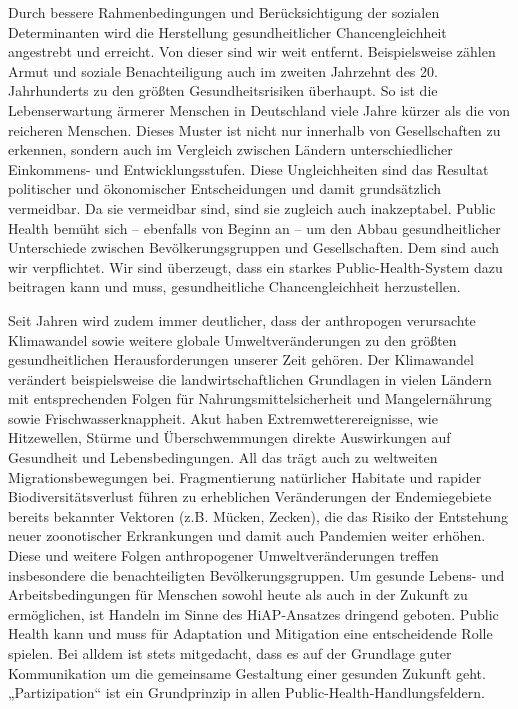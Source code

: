 \documentclass{article}
\begin{document}
Durch bessere Rahmenbedingungen und Berücksichtigung der sozialen Determinanten wird die Herstellung gesundheitlicher Chancengleichheit angestrebt und erreicht. Von dieser sind wir weit entfernt. Beispielsweise zählen Armut und soziale Benachteiligung auch im zweiten Jahrzehnt des 20. Jahrhunderts zu den größten Gesundheitsrisiken überhaupt. So ist die Lebenserwartung ärmerer Menschen in Deutschland viele Jahre kürzer als die von reicheren Menschen. Dieses Muster ist nicht nur innerhalb von Gesellschaften zu erkennen, sondern auch im Vergleich zwischen Ländern unterschiedlicher Einkommens- und Entwicklungsstufen. Diese Ungleichheiten sind das Resultat politischer und ökonomischer Entscheidungen und damit grundsätzlich vermeidbar. Da sie vermeidbar sind, sind sie zugleich auch inakzeptabel. Public Health bemüht sich – ebenfalls von Beginn an – um den Abbau gesundheitlicher Unterschiede zwischen Bevölkerungsgruppen und Gesellschaften. Dem sind auch wir verpflichtet. Wir sind überzeugt, dass ein starkes Public-Health-System dazu beitragen kann und muss, gesundheitliche Chancengleichheit herzustellen.


Seit Jahren wird zudem immer deutlicher, dass der anthropogen verursachte Klimawandel sowie weitere globale Umweltveränderungen zu den größten gesundheitlichen Herausforderungen unserer Zeit gehören. Der Klimawandel verändert beispielsweise die landwirtschaftlichen Grundlagen in vielen Ländern mit entsprechenden Folgen für Nahrungsmittelsicherheit und Mangelernährung sowie Frischwasserknappheit. Akut haben Extremwetterereignisse, wie Hitzewellen, Stürme und Überschwemmungen direkte Auswirkungen auf Gesundheit und Lebensbedingungen. All das trägt auch zu weltweiten Migrationsbewegungen bei. Fragmentierung natürlicher Habitate und rapider Biodiversitätsverlust führen zu erheblichen Veränderungen der Endemiegebiete bereits bekannter Vektoren (z.B. Mücken, Zecken), die das Risiko der Entstehung neuer zoonotischer Erkrankungen und damit auch Pandemien weiter erhöhen. Diese und weitere Folgen anthropogener Umweltveränderungen treffen insbesondere die benachteiligten Bevölkerungsgruppen. Um gesunde Lebens- und Arbeitsbedingungen für Menschen sowohl heute als auch in der Zukunft zu ermöglichen, ist Handeln im Sinne des HiAP-Ansatzes dringend geboten. Public Health kann und muss für Adaptation und Mitigation eine entscheidende Rolle spielen. Bei alldem ist stets mitgedacht, dass es auf der Grundlage guter Kommunikation um die gemeinsame Gestaltung einer gesunden Zukunft geht. „Partizipation“ ist ein Grundprinzip in allen Public-Health-Handlungsfeldern.
\end{document}
